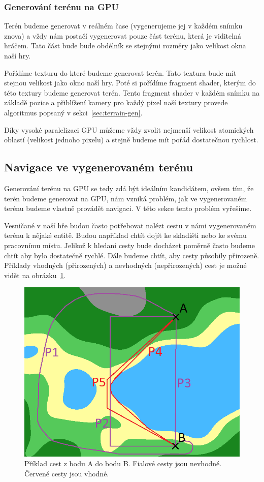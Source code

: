 \subsubsection{Generování terénu na GPU}
Terén budeme generovat v reálném čase (vygenerujeme jej v každém snímku znova) a vždy nám postačí vygenerovat pouze část terénu, která je viditelná hráčem. Tato část bude bude obdélník se stejnými rozměry jako velikost okna naší hry.

Pořídíme texturu do které budeme generovat terén. Tato textura bude mít stejnou velikost jako okno naší hry. Poté si pořídíme fragment shader, kterým do této textury budeme generovat terén. Tento fragment shader v každém snímku na základě pozice a přiblížení kamery pro každý pixel naší textury provede algoritmus popsaný v sekci~\ref{sec:terrain-gen}.

Díky vysoké paralelizaci GPU můžeme vždy zvolit nejmenší velikost atomických oblastí (velikost jednoho pixelu) a stejně budeme mít pořád dostatečnou rychlost.


\subsection{Navigace ve vygenerovaném terénu}
Generování terénu na GPU se tedy zdá být ideálním kandidátem, ovšem tím, že terén budeme generovat na GPU, nám vzniká problém, jak ve vygenerovaném terénu budeme vlastně provádět navigaci. V této sekce tento problém vyřešíme.

Vesničané v naší hře budou často potřebovat nalézt cestu v námi vygenerovaném terénu k nějaké entitě. Budou například chtít dojít ke skladišti nebo ke svému pracovnímu místu. Jelikož k hledaní cesty bude docházet poměrně často budeme chtít aby bylo dostatečně rychlé. Dále budeme chtít, aby cesty působily přirozeně. Příklady vhodných (přirozených) a nevhodných (nepřirozených) cest je možné vidět na obrázku~\ref{fig:path}.

\begin{figure}[!htb]
    \centering
    \includegraphics[width=0.66\linewidth]{img/path.png}
    \caption{Příklad cest z bodu A do bodu B. Fialové cesty jsou nevhodné. Červené cesty jsou vhodné.}
    \label{fig:path}
\end{figure}


